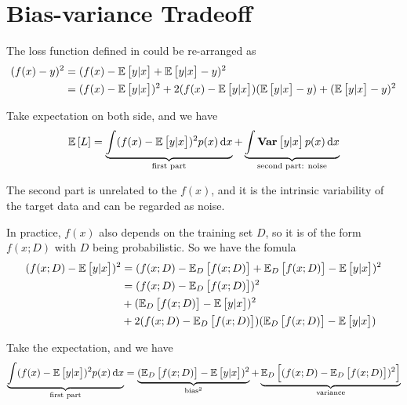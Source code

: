 \section{Bias-variance Tradeoff}

The loss function defined in  could be re-arranged as
\begin{equation}
    \begin{aligned}
        (f(x) - y)^2 &= (f(x) - \mathbb{E}\left[{y|x}\right] + \mathbb{E}\left[{y|x}\right] - y)^2 \\
        &= (f(x) - \mathbb{E}\left[{y|x}\right])^2 + 2 (f(x) - \mathbb{E}\left[{y|x}\right])(\mathbb{E}\left[{y|x}\right] - y) + (\mathbb{E}\left[{y|x}\right] - y)^2
    \end{aligned}
\end{equation}

Take expectation on both side, and we have
\begin{equation}
    \expectation{L} = \underbrace{\int (f(x) - \expectation{y|x})^2 p(x) \dif x}_{\text{first part}} + \underbrace{\int \variance{y|x} p(x) \dif x}_{\text{second part: noise}}
\end{equation}

The second part is unrelated to the $f(x)$, and it is the intrinsic variability of the target data and can be regarded as noise. 

In practice, $f(x)$ also depends on the training set $D$, so it is of the form $f(x;D)$ with $D$ being probabilistic. So we have the fomula
\begin{equation}
    \begin{aligned}
        (f(x;D) - \mathbb{E}\left[{y|x}\right])^2 &= (f(x;D) - \mathbb{E}_{D}\left[{f(x;D)}\right] + \mathbb{E}_{D}\left[{f(x;D)}\right] - \mathbb{E}\left[{y|x}\right])^2 \\
        &= (f(x;D) - \mathbb{E}_{D}\left[{f(x;D)}\right])^2 \\
        &+ (\mathbb{E}_{D}\left[{f(x;D)}\right] - \mathbb{E}\left[{y|x}\right])^2 \\
        &+ 2 (f(x;D) - \mathbb{E}_{D}\left[{f(x;D)}\right])(\mathbb{E}_{D}\left[{f(x;D)}\right] - \mathbb{E}\left[{y|x}\right])
    \end{aligned}
\end{equation}

Take the expectation, and we have
\begin{equation}
    \underbrace{\int (f(x) - \expectation{y|x})^2 p(x) \dif x}_{\text{first part}} = \underbrace{(\expectationonanvariable{D}{f(x;D)} - \expectation{y|x})^2}_{\text{bias}^2} + \underbrace{\expectationonanvariable{D}{(f(x;D) - \expectationonanvariable{D}{f(x;D)})^2}}_{\text{variance}}
\end{equation}

